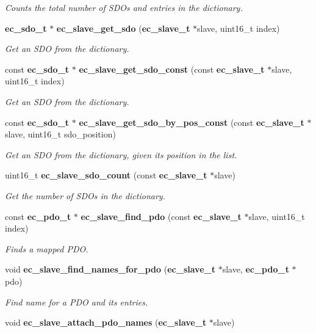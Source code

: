\begin{DoxyCompactItemize}
\begin{DoxyCompactList}\small\item\em Counts the total number of S\-D\-Os and entries in the dictionary. \end{DoxyCompactList}\item 
{\bf ec\-\_\-sdo\-\_\-t} $\ast$ {\bf ec\-\_\-slave\-\_\-get\-\_\-sdo} ({\bf ec\-\_\-slave\-\_\-t} $\ast$slave, uint16\-\_\-t index)
\begin{DoxyCompactList}\small\item\em Get an S\-D\-O from the dictionary. \end{DoxyCompactList}\item 
const {\bf ec\-\_\-sdo\-\_\-t} $\ast$ {\bf ec\-\_\-slave\-\_\-get\-\_\-sdo\-\_\-const} (const {\bf ec\-\_\-slave\-\_\-t} $\ast$slave, uint16\-\_\-t index)
\begin{DoxyCompactList}\small\item\em Get an S\-D\-O from the dictionary. \end{DoxyCompactList}\item 
const {\bf ec\-\_\-sdo\-\_\-t} $\ast$ {\bf ec\-\_\-slave\-\_\-get\-\_\-sdo\-\_\-by\-\_\-pos\-\_\-const} (const {\bf ec\-\_\-slave\-\_\-t} $\ast$slave, uint16\-\_\-t sdo\-\_\-position)
\begin{DoxyCompactList}\small\item\em Get an S\-D\-O from the dictionary, given its position in the list. \end{DoxyCompactList}\item 
uint16\-\_\-t {\bf ec\-\_\-slave\-\_\-sdo\-\_\-count} (const {\bf ec\-\_\-slave\-\_\-t} $\ast$slave)
\begin{DoxyCompactList}\small\item\em Get the number of S\-D\-Os in the dictionary. \end{DoxyCompactList}\item 
const {\bf ec\-\_\-pdo\-\_\-t} $\ast$ {\bf ec\-\_\-slave\-\_\-find\-\_\-pdo} (const {\bf ec\-\_\-slave\-\_\-t} $\ast$slave, uint16\-\_\-t index)
\begin{DoxyCompactList}\small\item\em Finds a mapped P\-D\-O. \end{DoxyCompactList}\item 
void {\bf ec\-\_\-slave\-\_\-find\-\_\-names\-\_\-for\-\_\-pdo} ({\bf ec\-\_\-slave\-\_\-t} $\ast$slave, {\bf ec\-\_\-pdo\-\_\-t} $\ast$pdo)\label{slave_8c_a631c175754fd611998871d85cbf14b6a}

\begin{DoxyCompactList}\small\item\em Find name for a P\-D\-O and its entries. \end{DoxyCompactList}\item 
void {\bf ec\-\_\-slave\-\_\-attach\-\_\-pdo\-\_\-names} ({\bf ec\-\_\-slave\-\_\-t} $\ast$slave)\label{slave_8c_a659775cbc8fdb6d41fe70eb9298d2780}


\end{DoxyCompactItemize}
